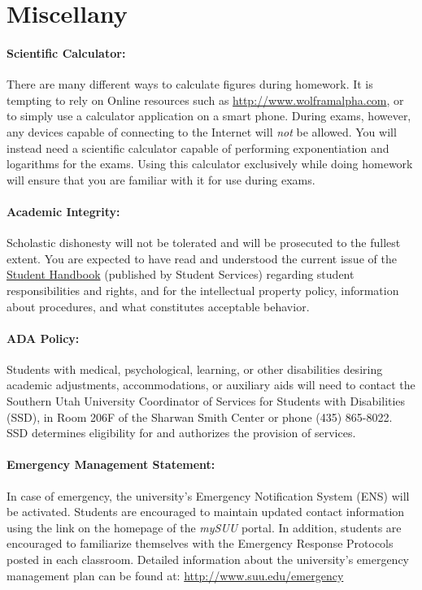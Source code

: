 \documentclass[12pt, letterpaper]{article}
\begin{document}
\section*{Miscellany}

\paragraph{Scientific Calculator:}
There are many different ways to calculate figures during homework. It is tempting to rely on Online resources such as \href{http://www.wolframalpha.com}{http://www.wolframalpha.com}, or to simply use a calculator application on a smart phone. During exams, however, any devices capable of connecting to the Internet will \emph{not} be allowed. You will instead need a scientific calculator capable of performing exponentiation and logarithms for the exams. Using this calculator exclusively while doing homework will ensure that you are familiar with it for use during exams.

\paragraph{Academic Integrity:}
Scholastic dishonesty will not be tolerated and will be prosecuted to the fullest extent. You are expected to have read and understood the current issue of the \href{https://help.suu.edu/handbook}{Student Handbook} (published by Student Services) regarding student responsibilities and rights, and for the intellectual property policy, information about procedures, and what constitutes acceptable behavior.

\paragraph{ADA Policy:}
Students with medical, psychological, learning, or other disabilities desiring academic adjustments, accommodations, or auxiliary aids will need to contact the Southern Utah University Coordinator of Services for Students with Disabilities (SSD), in Room 206F of the Sharwan Smith Center or phone (435) 865-8022. SSD determines eligibility for and authorizes the provision of services.

\paragraph{Emergency Management Statement:}
In case of emergency, the university's Emergency Notification System (ENS) will be activated. Students are encouraged to maintain updated contact information using the link on the homepage of the \emph{mySUU} portal. In addition, students are encouraged to familiarize themselves with the Emergency Response Protocols posted in each classroom. Detailed information about the university's emergency management plan can be found at: \href{http://www.suu.edu/emergency}{http://www.suu.edu/emergency}
\end{document}
